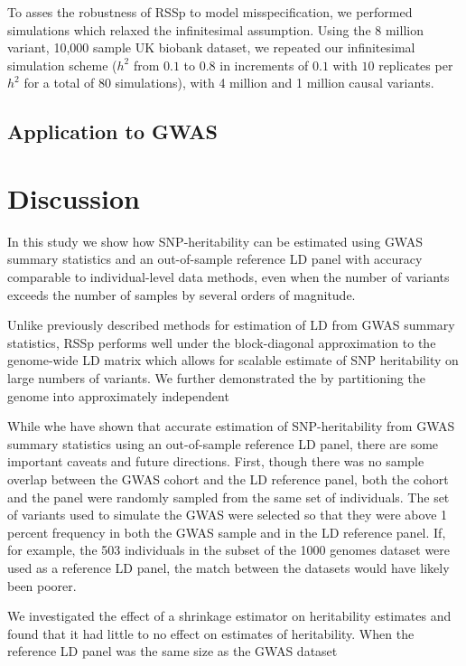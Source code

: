 To asses the robustness of RSSp to model misspecification, we performed simulations which relaxed the infinitesimal assumption.  Using the 8 million variant, 10,000 sample UK biobank dataset, we repeated our infinitesimal simulation scheme ($h^2$ from $0.1$ to $0.8$ in increments of $0.1$ with $10$ replicates per $h^2$ for a total of 80 simulations), with 4 million and 1 million causal variants.  


\subsection{Application to GWAS}


\section{Discussion}\label{sec:orge95691e}


In this study we show how SNP-heritability can be estimated using GWAS summary statistics and an out-of-sample reference LD panel with accuracy comparable to individual-level data methods, even when the number of variants exceeds the number of samples by several orders of magnitude.

Unlike previously described methods for estimation of LD from GWAS summary statistics, RSSp performs well under the block-diagonal approximation to the genome-wide LD matrix which allows for scalable estimate of SNP heritability on large numbers of variants. We further demonstrated the by partitioning the genome into approximately independent

While whe have shown that accurate estimation of SNP-heritability from GWAS summary statistics using an out-of-sample reference LD panel, there are some important caveats and future directions.  First, though there was no sample overlap between the GWAS cohort and the LD reference panel, both the cohort and the panel were randomly sampled from the same set of individuals.  The set of variants used to simulate the GWAS were selected so that they were above 1 percent frequency in both the GWAS sample and in the LD reference panel.  If, for example, the 503 individuals in the  subset of the 1000 genomes dataset were used as a reference LD panel, the match between the datasets would have likely been poorer.

We investigated the effect of a shrinkage estimator on heritability estimates and found that it had little to no effect on estimates of heritability.  When the reference LD panel was the same size as the GWAS dataset

